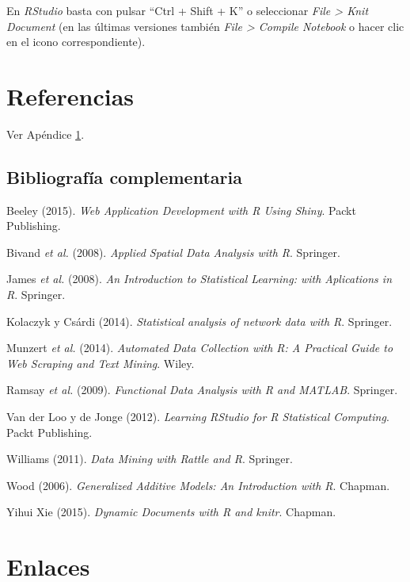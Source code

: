 \documentclass[]{book}
\begin{document}
En \emph{RStudio} basta con pulsar ``Ctrl + Shift + K'' o seleccionar \emph{File \textgreater{} Knit Document} (en las últimas versiones también \emph{File \textgreater{} Compile Notebook} o hacer clic en el icono correspondiente).

\hypertarget{referencias}{%
\chapter*{Referencias}\label{referencias}}

Ver Apéndice \ref{links}.

\hypertarget{bibliografia-complementaria}{%
\section*{Bibliografía complementaria}\label{bibliografia-complementaria}}

Beeley (2015). \emph{Web Application Development with R Using Shiny}.
Packt Publishing.

Bivand \emph{et al.} (2008). \emph{Applied Spatial Data Analysis with R}. Springer.

James \emph{et al.} (2008). \emph{An Introduction to Statistical Learning: with
Aplications in R}. Springer.

Kolaczyk y Csárdi (2014). \emph{Statistical analysis of network data with R}. Springer.

Munzert \emph{et al.} (2014). \emph{Automated Data Collection with R:
A Practical Guide to Web Scraping and Text Mining}. Wiley.

Ramsay \emph{et al.} (2009). \emph{Functional Data Analysis with R and MATLAB}.
Springer.

Van der Loo y de Jonge (2012). \emph{Learning RStudio for R Statistical
Computing}. Packt Publishing.

Williams (2011). \emph{Data Mining with Rattle and R}. Springer.

Wood (2006). \emph{Generalized Additive Models: An Introduction with R}. Chapman.

Yihui Xie (2015). \emph{Dynamic Documents with R and knitr}. Chapman.

\hypertarget{appendix-apendices}{%
\appendix}


\hypertarget{links}{%
\chapter{Enlaces}\label{links}}
\end{document}
